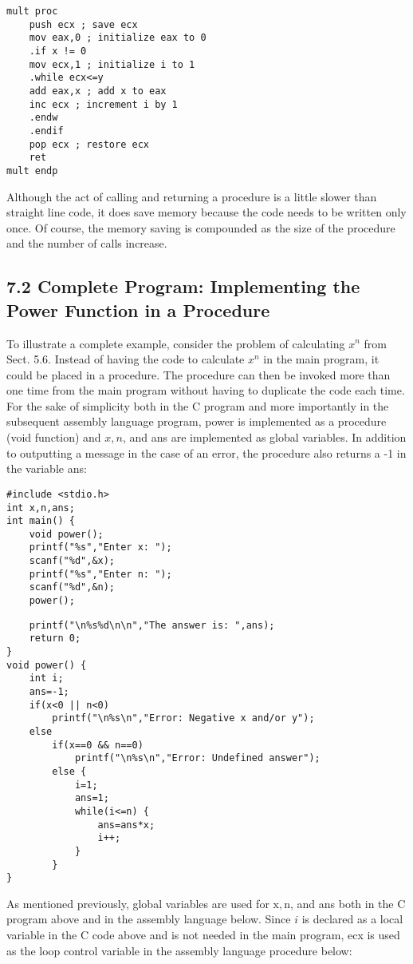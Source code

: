 \documentclass[10pt]{article}
\begin{document}
\begin{verbatim}
mult proc
    push ecx ; save ecx
    mov eax,0 ; initialize eax to 0
    .if x != 0
    mov ecx,1 ; initialize i to 1
    .while ecx<=y
    add eax,x ; add x to eax
    inc ecx ; increment i by 1
    .endw
    .endif
    pop ecx ; restore ecx
    ret
mult endp
\end{verbatim}

Although the act of calling and returning a procedure is a little slower than straight line code, it does save memory because the code needs to be written only once. Of course, the memory saving is compounded as the size of the procedure and the number of calls increase.

\subsection*{7.2 Complete Program: Implementing the Power Function in a Procedure}
To illustrate a complete example, consider the problem of calculating $x^{n}$ from Sect. 5.6. Instead of having the code to calculate $x^{n}$ in the main program, it could be placed in a procedure. The procedure can then be invoked more than one time from the main program without having to duplicate the code each time. For the sake of simplicity both in the C program and more importantly in the subsequent assembly language program, power is implemented as a procedure (void function) and $x, n$, and ans are implemented as global variables. In addition to outputting a message in the case of an error, the procedure also returns a -1 in the variable ans:

\begin{verbatim}
#include <stdio.h>
int x,n,ans;
int main() {
    void power();
    printf("%s","Enter x: ");
    scanf("%d",&x);
    printf("%s","Enter n: ");
    scanf("%d",&n);
    power();
\end{verbatim}

\begin{verbatim}
    printf("\n%s%d\n\n","The answer is: ",ans);
    return 0;
}
void power() {
    int i;
    ans=-1;
    if(x<0 || n<0)
        printf("\n%s\n","Error: Negative x and/or y");
    else
        if(x==0 && n==0)
            printf("\n%s\n","Error: Undefined answer");
        else {
            i=1;
            ans=1;
            while(i<=n) {
                ans=ans*x;
                i++;
            }
        }
}
\end{verbatim}

As mentioned previously, global variables are used for $\mathrm{x}, \mathrm{n}$, and ans both in the C program above and in the assembly language below. Since $i$ is declared as a local variable in the C code above and is not needed in the main program, ecx is used as the loop control variable in the assembly language procedure below:
\end{document}

